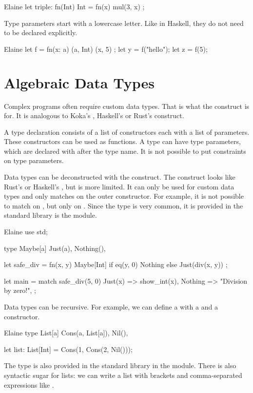 \begin{lst}{Elaine}
let triple: fn(Int) Int = fn(x) { mul(3, x) };
\end{lst}
%
Type parameters start with a lowercase letter. Like in Haskell, they do not need to be declared explicitly.

\begin{lst}{Elaine}
let f = fn(x: a) (a, Int) {
    (x, 5)
};
let y = f("hello");
let z = f(5);
\end{lst}
%
\section{Algebraic Data Types}

Complex programs often require custom data types. That is what the  construct is for. It is analogous to Koka's , Haskell's  or Rust's  construct.

A type declaration consists of a list of constructors each with a list of parameters. These constructors can be used as functions. A type can have type parameters, which are declared with \el{[]} after the type name. It is not possible to put constraints on type parameters.

Data types can be deconstructed with the  construct. The  construct looks like Rust's  or Haskell's , but is more limited. It can only be used for custom data types and only matches on the outer constructor. For example, it is not possible to match on , but only on . Since the  type is very common, it is provided in the standard library is the  module.

\begin{lst}{Elaine}
use std;

type Maybe[a] {
    Just(a),
    Nothing(),
}

let safe_div = fn(x, y) Maybe[Int] {
    if eq(y, 0) {
        Nothing
    } else {
        Just(div(x, y))
    }
};

let main = match safe_div(5, 0) {
    Just(x) => show_int(x),
    Nothing => "Division by zero!",
};
\end{lst}
%
Data types can be recursive. For example, we can define a  with a  and a  constructor.

\begin{lst}{Elaine}
type List[a] {
    Cons(a, List[a]),
    Nil(),
}

let list: List[Int] = Cons(1, Cons(2, Nil()));
\end{lst}
%
The  type is also provided in the standard library in the  module. There is also syntactic sugar for lists: we can write a list with brackets and comma-separated expressions like \el{[1, 2, 3]}.

